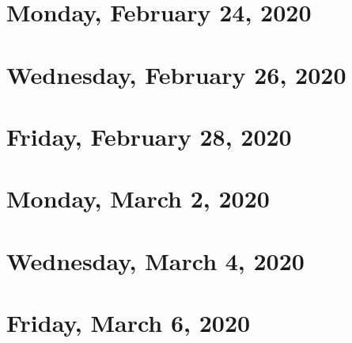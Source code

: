 \documentclass{../mynotes}
\begin{document}
\section{Monday, February 24, 2020}
	
\section{Wednesday, February 26, 2020}
    
\section{Friday, February 28, 2020}
    

\section{Monday, March 2, 2020}
	
\section{Wednesday, March 4, 2020}
    
\section{Friday, March 6, 2020}
    

% 	
%     
%     
\end{document}
